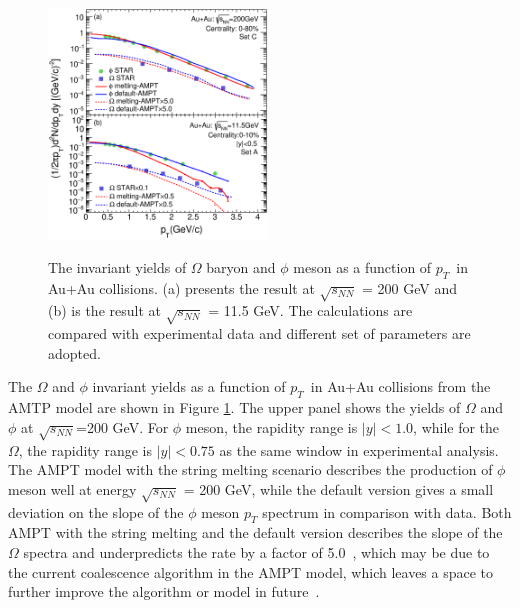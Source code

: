 \documentclass[twocolumn,aps,prc,showpacs,superscriptaddress,preprintnumbers,floatfix,nofootinbib]{revtex4}
\newcommand{ \pt } {${p_{T}}$}
\begin{document}
\begin{CJK*}{GBK}{song}
    \begin{figure}[htbp]
      \includegraphics[width=0.52\textwidth]{Fig2_paper_dndydpt.eps}\\
      \caption{The invariant yields of $\Omega$ baryon and $\phi$ meson as a function of \pt~in Au+Au collisions. (a) presents the result at $\sqrt{s_{NN}}$ = 200 GeV and (b) is the result at  $\sqrt{s_{NN}}$ = 11.5 GeV. The calculations are compared with experimental data and different set of parameters are adopted.}
      \label{dndydpt200}
    \end{figure}
    
The $\Omega$ and $\phi$ invariant yields as a function of \pt~in Au+Au collisions from the AMTP model are shown in Figure \ref{dndydpt200}. The upper panel shows the yields of $\Omega$ and $\phi$ at $\sqrt{s_{NN}}$=200 GeV. For $\phi$ meson, the rapidity range is $|y|<1.0$, while for the $\Omega$, the rapidity range is $|y|<0.75$ as the same window in experimental analysis. The AMPT model with the string melting scenario describes the production of $\phi$ meson well at energy $\sqrt{s_{NN}}$ = 200 GeV\cite{star_phi}, while the default version gives a small deviation on the slope of the $\phi$ meson $p_T$ spectrum in comparison with data. Both AMPT with the string melting and the default version describes the slope of the $\Omega$ spectra and underpredicts the rate by a factor of 5.0~\cite{star_Omega}, which may be due to the current coalescence algorithm in the AMPT model, which leaves a space to further improve the algorithm or model in future~\cite{AMPT-model}.



\end{CJK*}
\end{document}
